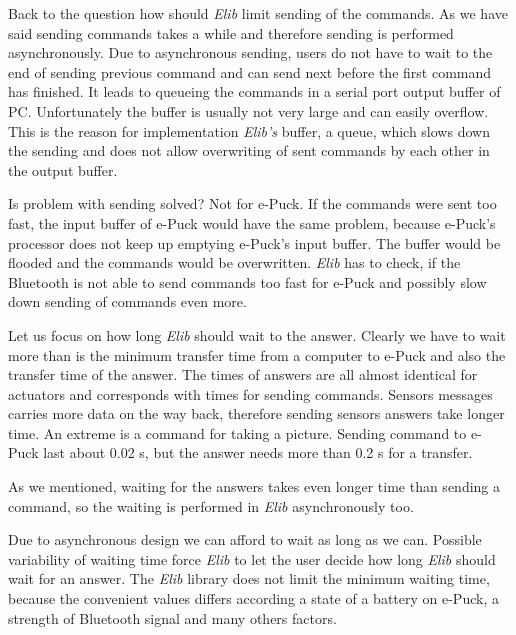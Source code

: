 	Back to the question how should {\it Elib} limit sending of the commands.
	As we have said sending commands takes a while and therefore sending is performed asynchronously. 
	Due to asynchronous sending, users do not have to wait to the end of sending previous command and
	can send next before the first command has finished.
	It leads to queueing the commands in a serial port output buffer of PC. Unfortunately the buffer is usually not 
	very large and can easily overflow. 
	This is the reason for implementation {\it Elib's} buffer, a queue, which slows down the sending and does not allow
	overwriting of sent commands by each other in the output buffer. 
	 
	Is problem with sending solved? Not for e-Puck. If the commands were sent too fast,
	the input buffer of e-Puck would have the same problem, because e-Puck's processor does not keep up emptying e-Puck's
	input buffer. The buffer would be flooded and the commands would be overwritten. 
	{\it Elib} has to check, if the Bluetooth is not able to send commands too fast for e-Puck
	and possibly slow down sending of commands even more.

	 
	Let us focus on how long {\it Elib} should wait to the answer.
	Clearly we have to wait more than is the minimum transfer time from a computer to e-Puck and also
	the transfer time of the answer.
	The times of answers are all almost identical for actuators and corresponds with times for sending commands.
	Sensors messages carries more data on the way back, therefore sending sensors answers take longer time.
	An extreme is a command for taking a picture. Sending command to e-Puck last about 0.02 s, but
	the answer needs more than 0.2 s for a transfer.
	 
	As we mentioned, waiting for the answers takes even longer time than sending a command,
	so the waiting is performed in {\it Elib} asynchronously too.
	 
	Due to asynchronous design we can afford to wait as long as we can. 
	Possible variability of waiting time force {\it Elib} to let the user decide how long
	 {\it Elib} should wait for an answer. The {\it Elib} library does not limit the minimum waiting time,
	because the convenient values differs according a state of a battery on e-Puck, a strength of Bluetooth signal
	and many others factors. 
	
